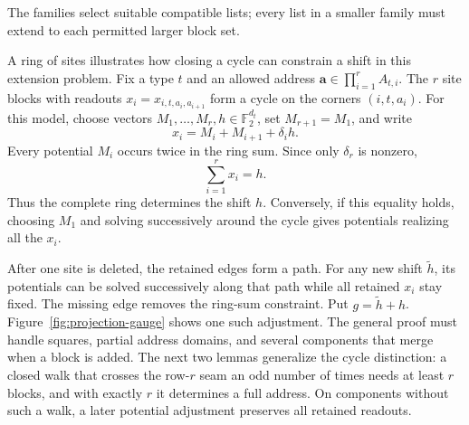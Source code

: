 \documentclass[11pt]{article}
\theoremstyle{definition}
\newcommand{\F}{\mathbb F_2}
\begin{document}
The families select suitable compatible lists; every list in a smaller
family must extend to each permitted larger block set.

A ring of sites illustrates how closing a cycle can constrain a shift
in this extension problem. Fix a type \(t\) and an allowed address
\(\mathbf a\in\prod_{i=1}^r A_{t,i}\). The \(r\) site blocks with
readouts \(x_i=x_{i,t,a_i,a_{i+1}}\) form a cycle on the corners
\((i,t,a_i)\). For this model, choose vectors
\(M_1,\ldots,M_r,h\in\F^{d_t}\), set \(M_{r+1}=M_1\), and write
\[
             x_i=M_i+M_{i+1}+\delta_i h.
\]
Every potential \(M_i\) occurs twice in the ring sum. Since only
\(\delta_r\) is nonzero,
\[
                         \sum_{i=1}^r x_i=h.
\]
Thus the complete ring determines the shift \(h\). Conversely, if
this equality holds, choosing \(M_1\) and solving successively around
the cycle gives potentials realizing all the \(x_i\).

After one site is deleted, the retained edges form a path. For any
new shift \(\widetilde h\), its potentials can be solved successively
along that path while all retained \(x_i\) stay fixed. The missing
edge removes the ring-sum constraint. Put \(g=\widetilde h+h\).
Figure~\ref{fig:projection-gauge} shows one such adjustment.
The general proof must handle squares,
partial address domains, and several components that merge when a
block is added. The next two lemmas generalize the cycle distinction:
a closed walk that crosses the row-\(r\) seam an odd number of times
needs at least \(r\) blocks, and with exactly \(r\) it determines a
full address. On components without such a walk, a later potential
adjustment preserves all retained readouts.
\end{document}
